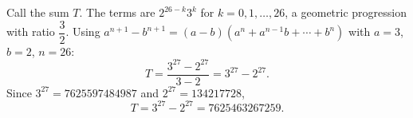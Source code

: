 Call the sum $T$. The terms are $2^{26-k}3^k$ for $k=0,1,\dots,26$, a geometric progression with ratio $\dfrac{3}{2}$. Using $a^{n+1}-b^{n+1}=(a-b)(a^n+a^{n-1}b+\cdots+b^n)$ with $a=3$, $b=2$, $n=26$:
\[
T=\dfrac{3^{27}-2^{27}}{3-2}=3^{27}-2^{27}.
\]
Since $3^{27}=7625597484987$ and $2^{27}=134217728$,
\[
T=\boxed{3^{27}-2^{27}=7625463267259}.
\]
